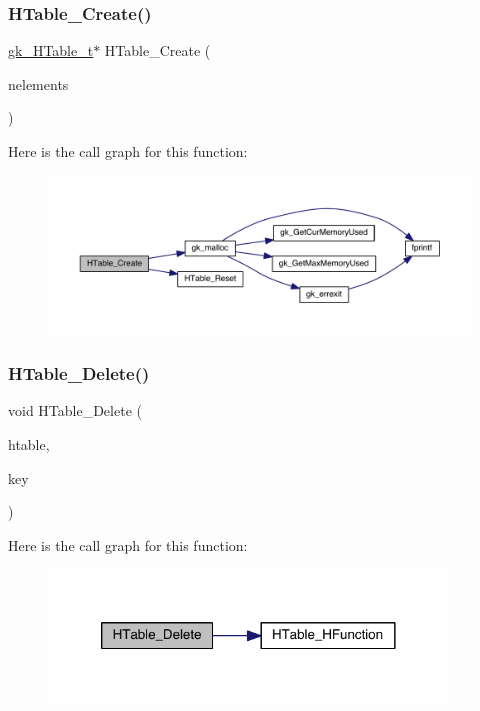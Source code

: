 \subsubsection{\texorpdfstring{H\+Table\+\_\+\+Create()}{HTable\_Create()}}
{\footnotesize\ttfamily \hyperlink{a00650}{gk\+\_\+\+H\+Table\+\_\+t}$\ast$ H\+Table\+\_\+\+Create (\begin{DoxyParamCaption}\item[{int}]{nelements }\end{DoxyParamCaption})}

Here is the call graph for this function\+:\nopagebreak
\begin{figure}[H]
\begin{center}
\leavevmode
\includegraphics[width=350pt]{a00098_a8dc2b324b10c45883dacbf58ac0b7efd_cgraph}
\end{center}
\end{figure}
\mbox{\label{a00098_a19564e2cf9bc13d7ba8b8d4ed2e9b1d1}} 
\subsubsection{\texorpdfstring{H\+Table\+\_\+\+Delete()}{HTable\_Delete()}}
{\footnotesize\ttfamily void H\+Table\+\_\+\+Delete (\begin{DoxyParamCaption}\item[{\hyperlink{a00650}{gk\+\_\+\+H\+Table\+\_\+t} $\ast$}]{htable,  }\item[{int}]{key }\end{DoxyParamCaption})}

Here is the call graph for this function\+:\nopagebreak
\begin{figure}[H]
\begin{center}
\leavevmode
\includegraphics[width=300pt]{a00098_a19564e2cf9bc13d7ba8b8d4ed2e9b1d1_cgraph}
\end{center}
\end{figure}
\mbox{\label{a00098_a4552b6bc8e0b509913638222daecf3aa}} 
